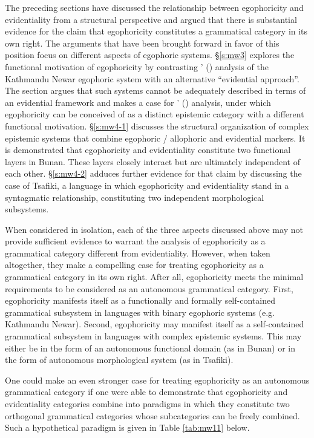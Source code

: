 \documentclass[output=paper]{langsci/langscibook}
\begin{document}
The preceding sections have discussed the relationship between egophoricity and evidentiality from a structural perspective and argued that there is substantial evidence for the claim that egophoricity constitutes a grammatical category in its own right. The arguments that have been brought forward in favor of this position focus on different aspects of egophoric systems. §\ref{s:mw3} explores the functional motivation of egophoricity by contrasting \citeauthor{Hargreaves2005}’ (\citeyear{Hargreaves2005}) analysis of the Kathmandu Newar egophoric system with an alternative “evidential approach”. The section argues that such systems cannot be adequately described in terms of an evidential framework and makes a case for \citeauthor{Hargreaves2005}’ (\citeyear{Hargreaves2005}) analysis, under which egophoricity can be conceived of as a distinct epistemic category with a different functional motivation. §\ref{s:mw4-1} discusses the structural organization of complex epistemic systems that combine egophoric / allophoric and evidential markers. It is demonstrated that egophoricity and evidentiality constitute two functional layers in Bunan. These layers closely interact but are ultimately independent of each other. §\ref{s:mw4-2} adduces further evidence for that claim by discussing the case of Tsafiki, a language in which egophoricity and evidentiality stand in a syntagmatic relationship, constituting two independent morphological subsystems.

When considered in isolation, each of the three aspects discussed above may not provide sufficient evidence to warrant the analysis of egophoricity as a grammatical category different from evidentiality. However, when taken altogether, they make a compelling case for treating egophoricity as a grammatical category in its own right. After all, egophoricity meets the minimal requirements to be considered as an autonomous grammatical category. First, egophoricity manifests itself as a functionally and formally self-contained grammatical subsystem in languages with binary egophoric systems (e.g. Kathmandu Newar). Second, egophoricity may manifest itself as a self-contained grammatical subsystem in languages with complex epistemic systems. This may either be in the form of an autonomous functional domain (as in Bunan) or in the form of autonomous morphological system (as in Tsafiki).

One could make an even stronger case for treating egophoricity as an autonomous grammatical category if one were able to demonstrate that egophoricity and evidentiality categories combine into paradigms in which they constitute two orthogonal grammatical categories whose subcategories can be freely combined. Such a hypothetical paradigm is given in Table \ref{tab:mw11} below.
\end{document}
